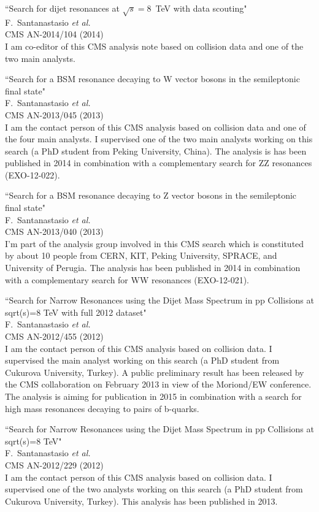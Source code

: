 \documentclass[10pt, a4paper]{article}
\begin{document}
\begin{thebibliography}{599}
``Search for dijet resonances at $\sqrt{s}=8$~TeV with data scouting"
  \\{}F.~Santanastasio {\it et al.}
  \\{}CMS AN-2014/104 (2014)
  \\ I am co-editor of this CMS analysis note based on collision data and one of the two main analysts. 

``Search for a BSM resonance decaying to W vector bosons in the semileptonic final state"
  \\{}F.~Santanastasio {\it et al.}
  \\{}CMS AN-2013/045 (2013)
  \\ I am the contact person of this CMS analysis based on collision data and one of the four main analysts. I supervised one of the two main analysts working on this search (a PhD student from Peking University, China). The analysis is has been published in 2014 in combination with a complementary search for ZZ resonances (EXO-12-022).

``Search for a BSM resonance decaying to Z vector bosons in the semileptonic final state"
  \\{}F.~Santanastasio {\it et al.}
  \\{}CMS AN-2013/040 (2013)
  \\ I'm part of the analysis group involved in this CMS search which is constituted by about 10 people from CERN, KIT, Peking University, SPRACE, and University of Perugia. 
The analysis has been published in 2014 in combination with a complementary search for WW resonances (EXO-12-021).

``Search for Narrow Resonances using the Dijet Mass Spectrum in pp Collisions at sqrt(s)=8 TeV with full 2012 dataset"
  \\{}F.~Santanastasio {\it et al.}
  \\{}CMS AN-2012/455 (2012)
  \\ I am the contact person of this CMS analysis based on collision data. I supervised the main analyst working on this search (a PhD student from Cukurova University, Turkey). A public preliminary result has been released by the CMS collaboration on February 2013 in view of the Moriond/EW conference. The analysis is aiming for publication in 2015 in combination with a search for high mass resonances decaying to pairs of b-quarks.

``Search for Narrow Resonances using the Dijet Mass Spectrum in pp Collisions at sqrt(s)=8 TeV"
  \\{}F.~Santanastasio {\it et al.}
  \\{}CMS AN-2012/229 (2012)
  \\ I am the contact person of this CMS analysis based on collision data. I supervised one of the two analysts working on this search (a PhD student from Cukurova University, Turkey). This analysis has been published in 2013.


\end{thebibliography}
\end{document}
